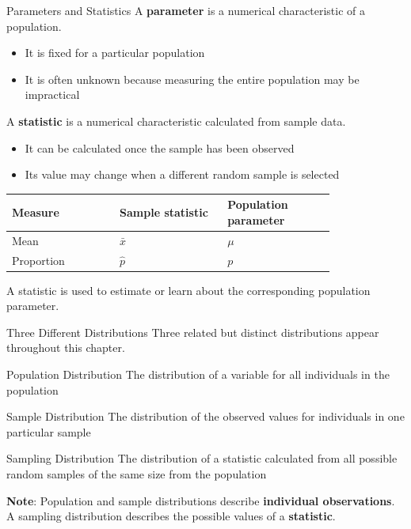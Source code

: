 \documentclass[aspectratio=169]{beamer}
\begin{document}
\begin{frame}{Parameters and Statistics}
A \textbf{parameter} is a numerical characteristic of a population.
\begin{itemize}
  \item It is fixed for a particular population
  \item It is often unknown because measuring the entire population may be impractical
\end{itemize}

\vspace{0.15cm}
A \textbf{statistic} is a numerical characteristic calculated from sample data.
\begin{itemize}
  \item It can be calculated once the sample has been observed
  \item Its value may change when a different random sample is selected
\end{itemize}

\vspace{0.15cm}

\begin{center}
\begin{tabular}{
  >{\RaggedRight\arraybackslash}p{0.27\linewidth}
  >{\centering\arraybackslash}p{0.27\linewidth}
  >{\centering\arraybackslash}p{0.27\linewidth}}
\toprule
Measure & Sample statistic & Population parameter \\
\midrule
Mean & $\bar{x}$ & $\mu$ \\
Proportion & $\hat{p}$ & $p$ \\
\bottomrule
\end{tabular}
\end{center}

A statistic is used to estimate or learn about the corresponding population parameter.
\end{frame}

\begin{frame}{Three Different Distributions}
Three related but distinct distributions appear throughout this chapter.

\begin{block}{Population Distribution}
The distribution of a variable for all individuals in the population
\end{block}

\begin{block}{Sample Distribution}
The distribution of the observed values for individuals in one particular sample
\end{block}

\begin{block}{Sampling Distribution}
The distribution of a statistic calculated from all possible random samples of the same size from the population
\end{block}

\textbf{Note}: Population and sample distributions describe \textbf{individual observations}. A sampling distribution describes the possible values of a \textbf{statistic}.
\end{frame}
\end{document}
